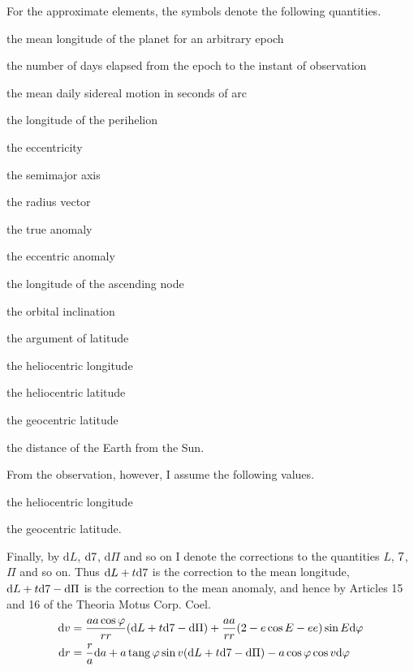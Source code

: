 For the approximate elements, the symbols denote the following quantities.
\begin{description}\setlength{\itemsep}{0pt}\setlength{\parsep}{0pt}
\item[$L$] the mean longitude of the planet for an arbitrary epoch
\item[$t$] the number of days elapsed from the epoch to the instant of observation
\item[$\MeanMotionGlyph$] the mean daily sidereal motion in seconds of arc
\item[$\Pi$] the longitude of the perihelion
\item[$e=\sin\varphi$] the eccentricity
\item[$a$] the semimajor axis
\item[$r$] the radius vector
\item[$v$] the true anomaly
\item[$E$] the eccentric anomaly
\item[$\AscendingNode$] the longitude of the ascending node
\item[$i$] the orbital inclination
\item[$u$] the argument of latitude
\item[$\lambda$] the heliocentric longitude
\item[$\gamma$] the heliocentric latitude
\item[$\ApproxBeta$] the geocentric latitude
\item[$R$] the distance of the Earth from the Sun.
\end{description}
From the observation, however, I assume the following values.
\begin{description}\setlength{\itemsep}{0pt}\setlength{\parsep}{0pt}
\item[$\alpha$] the heliocentric longitude
\item[$\ObservedBeta$] the geocentric latitude.
\end{description}
Finally, by $\mathrm dL$, $\mathrm d\mathord{7}$, $\mathrm d\Pi$ and so on I denote the corrections to the quantities $L$, $\MeanMotionGlyph$, $\Pi$ and so on. Thus $\mathrm dL+t\mathrm d\mathord{7}$ is the correction to the mean longitude,
$\mathrm dL+t\mathrm d\mathord{7}-\mathrm d\Pi$ is the correction to the mean anomaly,
and hence by Articles 15 and 16 of the Theoria Motus Corp. Coel.
\[
\begin{aligned}
\mathrm dv&=\frac{aa\cos\varphi}{rr}(\mathrm dL+t\mathrm d\mathord{7}-\mathrm d\Pi)+\frac{aa}{rr}(2-e\cos E-ee)\sin E\mathrm d\varphi\\
\mathrm dr&=\frac ra\mathrm da+a\operatorname{tang}\varphi\sin v(\mathrm dL+t\mathrm d\mathord{7}-\mathrm d\Pi)-a\cos\varphi\cos v\mathrm d\varphi
\end{aligned}
\]

